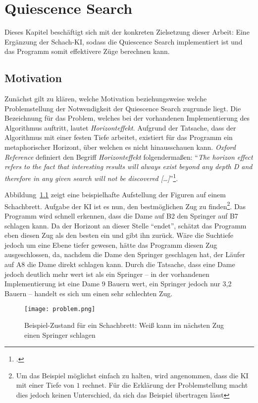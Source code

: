 
\chapter{Quiescence Search}\label{ch:quiescence}
Dieses Kapitel beschäftigt sich mit der konkreten Zielsetzung dieser Arbeit: Eine Ergänzung der Schach-KI, sodass die Quiescence Search implementiert ist und das Programm somit effektivere Züge berechnen kann. 

\section{Motivation}\label{section:motivation}
Zunächst gilt zu klären, welche Motivation beziehungsweise welche Problemstellung der Notwendigkeit der Quiescence Search zugrunde liegt. Die Bezeichnung für das Problem, welches bei der vorhandenen Implementierung des Algorithmus auftritt, lautet \textit{Horizonteffekt}. Aufgrund der Tatsache, dass der Algorithmus mit einer festen Tiefe arbeitet, existiert für das Programm ein metaphorischer Horizont, über welchen es nicht hinausschauen kann. \textit{Oxford Reference} definiert den Begriff \textit{Horizonteffekt} folgendermaßen: "`\textit{The horizon effect refers to the fact that interesting results will always exist beyond any depth D and therefore in any given search will not be discovered […]}"'\footcite{oxford}.

Abbildung~\ref{fig:problem} zeigt eine beispielhafte Aufstellung der Figuren auf einem Schachbrett. Aufgabe der KI ist es nun, den bestmöglichen Zug zu finden\footnote{Um das Beispiel möglichst einfach zu halten, wird angenommen, dass die KI mit einer Tiefe von $1$ rechnet. Für die Erklärung der Problemstellung macht dies jedoch keinen Unterschied, da sich das Beispiel übertragen lässt}.  Das Programm wird schnell erkennen, dass die Dame auf B2 den Springer auf B7 schlagen kann. Da der Horizont an dieser Stelle "`endet"', schätzt das Programm eben diesen Zug als den besten ein und gibt ihn zurück. Wäre die Suchtiefe jedoch um eine Ebene tiefer gewesen, hätte das Programm diesen Zug ausgeschlossen, da, nachdem die Dame den Springer geschlagen hat, der Läufer auf A8 die Dame direkt schlagen kann. Durch die Tatsache, dass eine Dame jedoch deutlich mehr wert ist als ein Springer -- in der vorhandenen Implementierung ist eine Dame 9 Bauern wert, ein Springer jedoch nur 3,2 Bauern -- handelt es sich um einen sehr schlechten Zug.

\begin{figure}[H]
	\texttt{[image: problem.png]}
	\caption{Beispiel-Zustand für ein Schachbrett: Weiß kann im nächsten Zug einen Springer schlagen}
	\label{fig:problem}
\end{figure}

